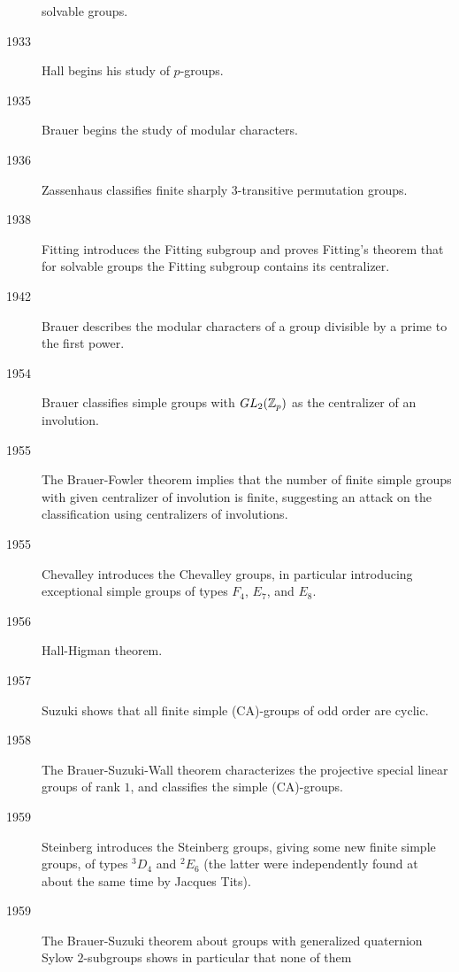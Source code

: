 \documentclass{ximera}
\begin{document}
\begin{description}
  solvable groups.
\item[1933] Hall begins his study of $p$-groups.
\item[1935] Brauer begins the study of modular characters.
\item[1936] Zassenhaus classifies finite sharply $3$-transitive
  permutation groups.
\item[1938] Fitting introduces the Fitting subgroup and proves
  Fitting's theorem that for solvable groups the Fitting subgroup
  contains its centralizer.
\item[1942] Brauer describes the modular characters of a group
  divisible by a prime to the first power.
\item[1954]	Brauer classifies simple groups with $GL_2(\mathbb Z_p)$ as the centralizer of an involution. %
\item[1955] The Brauer-Fowler theorem implies that the number of
  finite simple groups with given centralizer of involution is finite,
  suggesting an attack on the classification using centralizers of
  involutions.
\item[1955] Chevalley introduces the Chevalley groups, in particular
  introducing exceptional simple groups of types $F_4$, $E_7$, and
  $E_8$.
\item[1956] Hall-Higman theorem.
\item[1957] Suzuki shows that all finite simple (CA)-groups of odd
  order are cyclic.
\item[1958] The Brauer-Suzuki-Wall theorem characterizes the
  projective special linear groups of rank $1$, and classifies the
  simple (CA)-groups.
\item[1959] Steinberg introduces the Steinberg groups, giving some new
  finite simple groups, of types $^3D_4$ and $^2E_6$ (the latter were
  independently found at about the same time by Jacques Tits).
\item[1959] The Brauer-Suzuki theorem about groups with generalized
  quaternion Sylow $2$-subgroups shows in particular that none of them

\end{description}
\end{document}
